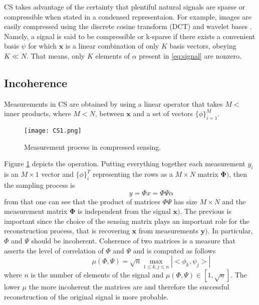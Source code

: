 CS takes advantage of the certainty that plentiful natural signals are sparse or compressible when stated in a condensed representaion. For example, images are easily compressed using the discrete cosine transform (DCT) and wavelet bases \cite{mallat1999wavelet}. Namely, a signal is said to be compressible or k-sparse if there exists a convenient basis $\psi$ for which $\mathbf{x}$ is a linear combination of only $K$ basis vectors, obeying $K \ll N$. That means, only $K$ elements of $\alpha$ present in \ref{eq:signal} are nonzero. 

\FloatBarrier

\subsection{Incoherence}
Measurements in CS are obtained by using a linear operator that takes $M < $ inner products, where $M < N$, between $\mathbf{x}$ and a set of vectors $\{\phi\}_{i=1}^{M}$. 
\begin{figure}[!tb] 
\centering 
\texttt{[image: CS1.png]} 
\caption[Compressed sensing measurement process]{Measurement process in compressed sensing.}
\label{fig:csmea} 
\end{figure}
Figure \ref{fig:csmea} depicts the operation. Putting everything together each measurement $y_i$ is an $ M \times 1$ vector and $\{\phi\}_{i}^{T}$ representing the rows as a $ M \times N$ matrix $\mathbf{\Phi)}$, then the sampling process is
\begin{equation} \label{eq:signal2}
\hspace{3em} \hspace{3em} \hspace{3em} y = \Phi x = \Phi\Psi\alpha \hspace{3em}
\end{equation}    
from that one can see that the product of matrices $\Phi\Psi$ has size $ M \times N$ and the measurement matrix $\mathbf{\Phi}$ is independent from the signal $\mathbf{x)}$. The previous is important since the choice of the sensing matrix plays an important role for the reconstruction process, that is recovering $\mathbf{x}$ from measurements $\mathbf{y)}$. In particular, $\Phi$ and $\Psi$ should be incoherent. Coherence of two matrices is a measure that asserts the level of correlation of $\Phi$ and $\Psi$ and is computed as follows
\begin{equation} \label{eq:signal3}
\hspace{3em} \hspace{3em} \hspace{3em} \mu(\Phi,\Psi) = \sqrt{n}  \max_{ 1 \leq k,j \leq n}|<\phi_k,\psi_j>|  \hspace{3em}
\end{equation}   
where $n$ is the number of elements of the signal and $ \mu(\Phi,\Psi) \in [ 1, \sqrt{n} ] $. The lower $\mu$ the more incoherent the matrices are and therefore the successful reconstruction of the original signal is more probable.


